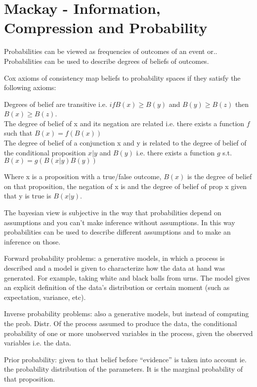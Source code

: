 \section{Mackay - Information, Compression and Probability}

Probabilities can be viewed  as frequencies of outcomes of an event or..\\
Probabilities can be used to describe degrees of beliefs of outcomes.

Cox axioms of consistency map beliefs to probability spaces if they satisfy the following axioms:

Degrees of belief are transitive i.e. $if B(x) \geq B(y)$ and $B(y) \geq B(z)$ then $B(x) \geq B(z)$. \\
The degree of belief of x and its negation  are related i.e. there exists a function $f$ such that $B(x) = f(B(x))$ \\
The degree of belief of a conjunction x and y is related to the degree of belief of the conditional proposition $x | y$ and $B(y)$ i.e. there exists a function $g$ s.t. $B(x) = g(B(x | y)B(y))$

Where x is a proposition with a true/false outcome, $B(x)$ is the degree of belief on that proposition, the negation of x is  and the degree of belief of prop x given that y is true is $B(x | y)$.

The bayesian view is subjective in the way that  probabilities depend on assumptions and you can’t make inference without assumptions.
In this way probabilities can be used to describe different assumptions and to make an inference on those. 

Forward probability problems: a generative models, in which a process is described and a model is given to characterize how the data at hand was generated. For example, taking white and black balls from urns. The model gives an explicit definition of the data’s distribution or certain moment (such as expectation, variance, etc).

Inverse probability problems: also a generative models, but instead of computing the prob. Distr. Of the process assumed to produce the data, the conditional probability of one or more unobserved variables in the process, given the observed variables i.e. the data.

Prior probability: given to that belief before “evidence” is taken into account ie. the probability distribution of the parameters. It is the marginal probability of that proposition. 

